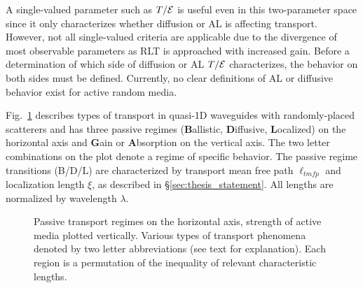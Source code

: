 A single-valued parameter such as $T/{\cal E}$ is useful even in this two-parameter space since it only characterizes whether diffusion or AL is affecting transport. However, not all single-valued criteria are applicable due to the divergence of most observable parameters as RLT is approached with increased gain. Before a determination of which side of diffusion or AL $T/{\cal E}$ characterizes, the behavior on both sides must be defined. Currently, no clear definitions of AL or diffusive behavior exist for active random media.

Fig.~\ref{fig:regime_plot_main} describes types of transport in quasi-1D waveguides with randomly-placed scatterers and has three passive regimes (\textbf{B}allistic, \textbf{D}iffusive, \textbf{L}ocalized) on the horizontal axis and \textbf{G}ain or \textbf{A}bsorption on the vertical axis. The two letter combinations on the plot denote a regime of specific behavior. The passive regime transitions (B/D/L) are characterized by transport mean free path $\ell_{tmfp}$ and localization length $\xi$, as described in \S \ref{sec:thesis_statement}. All lengths are normalized by wavelength $\lambda$. 

\begin{figure}
\vskip -0.5cm
\centerline{
}
\vskip -0.5cm
\caption{Passive transport regimes on the horizontal axis, strength of active media plotted vertically. Various types of transport phenomena denoted by two letter abbreviations (see text for explanation). Each region is a permutation of the inequality of relevant characteristic lengths.
}
\label{fig:regime_plot_main}
\end{figure}


